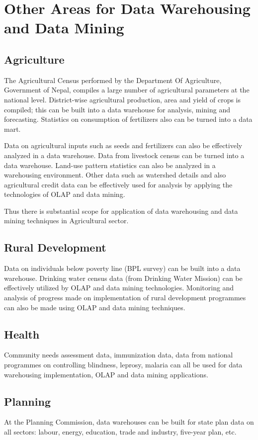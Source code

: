 \section{Other Areas for Data Warehousing and Data Mining}
\subsection{Agriculture}
The Agricultural Census performed by the Department Of Agriculture, Government
of Nepal, compiles a large number of agricultural parameters at the national
level. District-wise agricultural production, area and yield of crops is compiled;
this can be built into a data warehouse for analysis, mining and forecasting.
Statistics on consumption of fertilizers also can be turned into a data mart.

Data on agricultural inputs such as seeds and fertilizers can also be
effectively analyzed in a data warehouse. Data from livestock census can be
turned into a data warehouse. Land-use pattern statistics can also be analyzed in
a warehousing environment. Other data such as watershed details and also
agricultural credit data can be effectively used for analysis by applying the
technologies of OLAP and data mining.

Thus there is substantial scope for application of data warehousing and
data mining techniques in Agricultural sector.


\subsection{Rural Development}
Data on individuals below poverty line (BPL survey) can be built into a data
warehouse. Drinking water census data (from Drinking Water Mission) can be
effectively utilized by OLAP and data mining technologies. Monitoring and
analysis of progress made on implementation of rural development programmes
can also be made using OLAP and data mining techniques.

\subsection{Health}
Community needs assessment data, immunization data, data from national
programmes on controlling blindness, leprosy, malaria can all be used for data
warehousing implementation, OLAP and data mining applications.

\subsection{Planning}
At the Planning Commission, data warehouses can be built for state plan data
on all sectors: labour, energy, education, trade and industry, five-year plan, etc.



